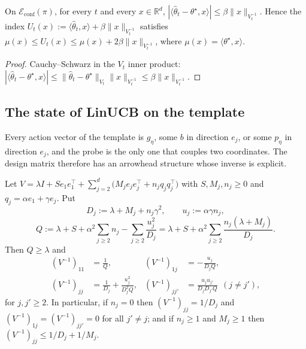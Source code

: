 \documentclass[anon]{alt2027} %
\newcommand{\R}{\mathbb{R}}
\begin{document}
\begin{lemma}
\label{lem:cat-conf}
On $\mathcal E_{\mathrm{conf}}(\pi)$, for every $t$ and every $x\in\R^d$,
$|\langle\widehat\theta_t-\theta^\star,x\rangle|\le\beta\|x\|_{V_t^{-1}}$.
Hence the index $U_t(x):=\langle\widehat\theta_t,x\rangle+\beta\|x\|_{V_t^{-1}}$
satisfies $\mu(x)\le U_t(x)\le\mu(x)+2\beta\|x\|_{V_t^{-1}}$, where
$\mu(x)=\langle\theta^\star,x\rangle$.
\end{lemma}

\begin{proof}
Cauchy--Schwarz in the $V_t$ inner product:
$|\langle\widehat\theta_t-\theta^\star,x\rangle|\le\|\widehat\theta_t-\theta^\star\|_{V_t}\|x\|_{V_t^{-1}}\le\beta\|x\|_{V_t^{-1}}$.
\end{proof}

\subsection{The state of LinUCB on the template}

Every action vector of the template is $g_\eta$, some $b$ in direction $e_j$,
or some $p_\eta$ in direction $e_j$, and the probe is the only one that couples
two coordinates. The design matrix therefore has an arrowhead structure whose
inverse is explicit.

\begin{lemma}
\label{lem:arrowhead}
Let $V=\lambda I+Se_1e_1^\top+\sum_{j=2}^{d}\bigl(M_je_je_j^\top+n_jq_jq_j^\top\bigr)$
with $S,M_j,n_j\ge0$ and $q_j=\alpha e_1+\gamma e_j$. Put
\[
D_j:=\lambda+M_j+n_j\gamma^2,\qquad u_j:=\alpha \gamma n_j,
\]
\[
Q:=\lambda+S+\alpha^2\sum_{j\ge2}n_j-\sum_{j\ge2}\frac{u_j^2}{D_j}
=\lambda+S+\alpha^2\sum_{j\ge2}\frac{n_j(\lambda+M_j)}{D_j}.
\]
Then $Q\ge\lambda$ and
\begin{align*}
(V^{-1})_{11}&=\frac1Q,&
(V^{-1})_{1j}&=-\frac{u_j}{D_jQ},\\
(V^{-1})_{jj}&=\frac1{D_j}+\frac{u_j^2}{D_j^2Q},&
(V^{-1})_{jj'}&=\frac{u_ju_{j'}}{D_jD_{j'}Q}\ \ (j\ne j'),
\end{align*}
for $j,j'\ge2$. In particular, if $n_j=0$ then
$(V^{-1})_{jj}=1/D_j$ and $(V^{-1})_{1j}=(V^{-1})_{jj'}=0$ for all $j'\ne j$; and
if $n_j\ge1$ and $M_j\ge1$ then $(V^{-1})_{jj}\le 1/D_j+1/M_j$.
\end{lemma}
\end{document}
